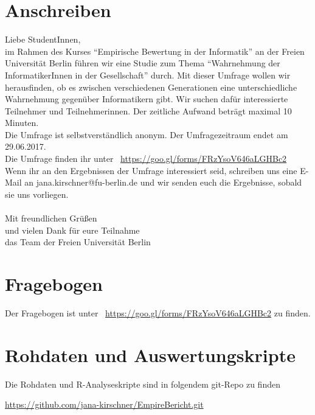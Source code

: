 \documentclass[de]{agse-empir-report}\usepackage[]{graphicx}\usepackage[]{color}
\begin{document}
\nocite{*}




\appendix

\section{Anschreiben}

Liebe StudentInnen,\\
im Rahmen des Kurses “Empirische Bewertung in der Informatik” an der Freien Universität Berlin führen wir eine Studie zum Thema “Wahrnehmung der InformatikerInnen in der Gesellschaft” durch. Mit dieser Umfrage wollen wir herausfinden, ob es zwischen verschiedenen Generationen eine unterschiedliche Wahrnehmung gegenüber Informatikern gibt. Wir suchen dafür interessierte Teilnehmer und Teilnehmerinnen. Der zeitliche Aufwand beträgt maximal 10 Minuten.\\
Die Umfrage ist selbstverständlich anonym. Der Umfragezeitraum endet am 29.06.2017.\\

Die Umfrage finden ihr  unter ~\url{https://goo.gl/forms/FRzYsoV646aLGHBc2} \\

Wenn ihr an den Ergebnissen der Umfrage interessiert seid, schreiben uns eine E-Mail an jana.kirschner@fu-berlin.de und wir senden euch die Ergebnisse, sobald sie uns vorliegen.\\ \\

Mit freundlichen Grüßen\\
und vielen Dank für eure Teilnahme\\ 
das Team der Freien Universität Berlin\\



\section{Fragebogen}

Der Fragebogen ist unter ~\url{https://goo.gl/forms/FRzYsoV646aLGHBc2} zu finden.


\section{Rohdaten und Auswertungskripte}

Die Rohdaten und R-Analyseskripte sind in folgendem git-Repo zu finden

\url{https://github.com/jana-kirschner/EmpireBericht.git}
\end{document}
